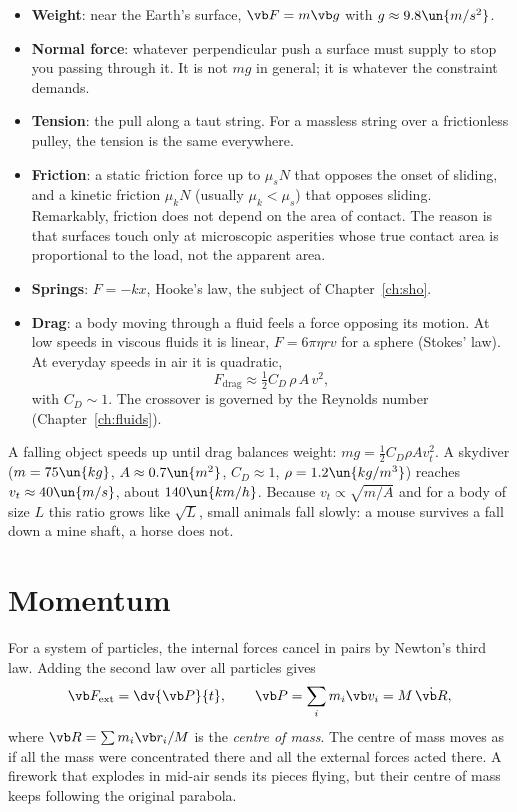 \begin{itemize}[itemsep=4pt]
  \item \textbf{Weight}: near the Earth's surface, $\vb F = m\vb g$ with $g\approx9.8\un{m/s^2}$.
  \item \textbf{Normal force}: whatever perpendicular push a surface must supply to stop you passing through it. It is not $mg$ in general; it is whatever the constraint demands.
  \item \textbf{Tension}: the pull along a taut string. For a massless string over a frictionless pulley, the tension is the same everywhere.
  \item \textbf{Friction}: a static friction force up to $\mu_s N$ that opposes the onset of sliding, and a kinetic friction $\mu_k N$ (usually $\mu_k < \mu_s$) that opposes sliding. Remarkably, friction does not depend on the area of contact. The reason is that surfaces touch only at microscopic asperities whose true contact area is proportional to the load, not the apparent area.
  \item \textbf{Springs}: $F = -kx$, Hooke's law, the subject of Chapter~\ref{ch:sho}.
  \item \textbf{Drag}: a body moving through a fluid feels a force opposing its motion. At low speeds in viscous fluids it is linear, $F = 6\pi\eta r v$ for a sphere (Stokes' law). At everyday speeds in air it is quadratic,
  \[
    F_{\text{drag}} \approx \tfrac12 C_D\,\rho\,A\,v^2,
  \]
  with $C_D\sim 1$. The crossover is governed by the Reynolds number (Chapter~\ref{ch:fluids}).
\end{itemize}

\begin{example}
A falling object speeds up until drag balances weight: $mg = \tfrac12 C_D\rho A v_t^2$. A skydiver ($m=75\un{kg}$, $A\approx0.7\un{m^2}$, $C_D\approx1$, $\rho = 1.2\un{kg/m^3}$) reaches $v_t\approx 40\un{m/s}$, about $140\un{km/h}$. Because $v_t\propto\sqrt{m/A}$ and for a body of size $L$ this ratio grows like $\sqrt{L}$, small animals fall slowly: a mouse survives a fall down a mine shaft, a horse does not.
\end{example}

\section{Momentum}
\label{sec:momentum}

For a system of particles, the internal forces cancel in pairs by Newton's third law. Adding the second law over all particles gives
\[
  \vb F_{\text{ext}} = \dv{\vb P}{t}, \qquad \vb P = \sum_i m_i\vb v_i = M\,\dot{\vb R},
\]
where $\vb R = \sum m_i\vb r_i/M$ is the \emph{centre of mass}. The centre of mass moves as if all the mass were concentrated there and all the external forces acted there. A firework that explodes in mid-air sends its pieces flying, but their centre of mass keeps following the original parabola.

